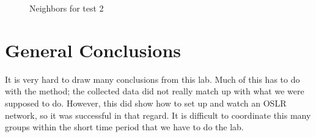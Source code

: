 \documentclass[11pt]{article}
\begin{document}
\begin{figure}[hp]
	\caption{Neighbors for test 2}
	\label{n_2}
\end{figure}

\section{General Conclusions}

It is very hard to draw many conclusions from this lab. Much of this has to do with the method; the collected data did not really match up with what we were supposed to do. However, this did show how to set up and watch an OSLR network, so it was successful in that regard. It is difficult to coordinate this many groups within the short time period that we have to do the lab. 
\end{document}

